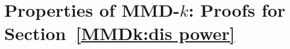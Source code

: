 \documentclass[aps,prx,reprint,superscriptaddress,amsmath,amssymb,longbibliography,floatfix]{revtex4-2}
\newcommand{\XC}[1]{{\textcolor{purple}{#1}}}
\theoremstyle{plain}
\theoremstyle{definition}
\theoremstyle{remark}
\begin{document}





\newpage









\newpage
\twocolumngrid
\appendix
\setcounter{tocdepth}{1}
\tableofcontents 

\newpage 



\section{Properties of MMD-$k$: Proofs for Section~\ref{MMDk:dis power}}
\end{document}
